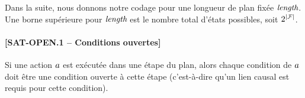 


Dans la suite, nous donnons notre codage pour une longueur de plan fixée $\textit{length}$. Une borne supérieure pour $\textit{length}$ est le nombre total d'états possibles, soit $2^{\mid\mathcal{F}\mid}$.

\paragraph*{[SAT-OPEN.1 -- Conditions ouvertes]}
Si une action $a$ est exécutée dans une étape du plan, alors chaque condition de $a$ doit être une condition ouverte à cette étape (c'est-à-dire qu'un lien causal est requis pour cette condition).

